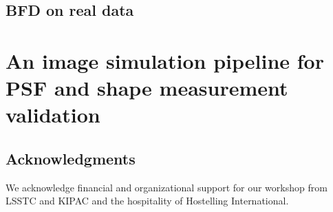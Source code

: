 \documentclass[\docopts]{\docclass}
\begin{document}
\subsection{BFD on real data}




\section{An image simulation pipeline for PSF and shape measurement validation}



\subsection*{Acknowledgments}

We acknowledge financial and organizational support for our workshop from LSSTC and KIPAC and the hospitality of Hostelling International.





\end{document}
